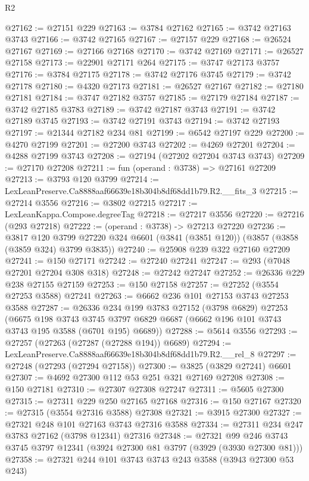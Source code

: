 \begin{lexlean}{R2}
\begin{coremodule}
@27162 := @27151 @229
@27163 := @3784 @27162
@27165 := @3742 @27163 @3743
@27166 := @3742 @27165
@27167 := @27157 @229
@27168 := @26524 @27167
@27169 := @27166 @27168
@27170 := @3742 @27169
@27171 := @26527 @27158
@27173 := @22901 @27171 @264
@27175 := @3747 @27173 @3757
@27176 := @3784 @27175
@27178 := @3742 @27176 @3745
@27179 := @3742 @27178
@27180 := @4320 @27173
@27181 := @26527 @27167
@27182 := @27180 @27181
@27184 := @3747 @27182 @3757
@27185 := @27179 @27184
@27187 := @3742 @27185 @3783
@27189 := @3742 @27187 @3743
@27191 := @3742 @27189 @3745
@27193 := @3742 @27191 @3743
@27194 := @3742 @27193
@27197 := @21344 @27182 @234 @81
@27199 := @6542 @27197 @229
@27200 := @4270 @27199
@27201 := @27200 @3743
@27202 := @4269 @27201
@27204 := @4288 @27199 @3743
@27208 := @27194 (@27202 @27204 @3743 @3743)
@27209 := @27170 @27208
@27211 := fun (operand : @3738) => @27161 @27209
@27213 := @3793 @120 @3799
@27214 := LexLeanPreserve.Ca8888aaf66639e18b304b8df68dd1b79.R2.__fits_3
@27215 := @27214 @3556
@27216 := @3802 @27215
@27217 := LexLeanKappa.Compose.degreeTag
@27218 := @27217 @3556
@27220 := @27216 (@293 @27218)
@27222 := (operand : @3738) -> @27213 @27220
@27236 := @3817
    @120
    @3799
    @27220
    @324
    @6601
    (@3841 (@3851 @120))
    (@3857 (@3858 (@3859 @324) @3799 @3835))
@27240 := @25908 @239 @322 @27160 @27209
@27241 := @150 @27171
@27242 := @27240 @27241
@27247 := @293 (@7048 @27201 @27204 @308 @318)
@27248 := @27242 @27247
@27252 := @26336 @229 @238 @27155 @27159
@27253 := @150 @27158
@27257 := @27252 (@3554 @27253 @3588) @27241
@27263 := @6662 @236 @101 @27153 @3743 @27253 @3588
@27287 := @26336
    @234
    @199
    @3783
    @27152
    (@3798 @6829)
    @27253
    (@6675
      @198
      @3743
      @3745
      @3797
      @6829
      @6687
      (@6662 @196 @101 @3743 @3743 @195 @3588 (@6701 @195) @6689))
@27288 := @5614 @3556
@27293 := @27257 (@27263 (@27287 (@27288 @194)) @6689)
@27294 := LexLeanPreserve.Ca8888aaf66639e18b304b8df68dd1b79.R2.__rel_8
@27297 := @27248 (@27293 (@27294 @27158))
@27300 := @3825 (@3829 @27241) @6601
@27307 := @4692 @27300 @112 @53 @251 @321 @27169 @27208
@27308 := @150 @27181
@27310 := @27307 @27308 @27247
@27311 := @5605 @27300
@27315 := @27311 @229 @250 @27165 @27168
@27316 := @150 @27167
@27320 := @27315 (@3554 @27316 @3588) @27308
@27321 := @3915 @27300
@27327 := @27321 @248 @101 @27163 @3743 @27316 @3588
@27334 := @27311 @234 @247 @3783 @27162 (@3798 @12341) @27316
@27348 := @27321
    @99
    @246
    @3743
    @3745
    @3797
    @12341
    (@3924 @27300 @81 @3797 (@3929 (@3930 @27300 @81)))
@27358 := @27321 @244 @101 @3743 @3743 @243 @3588 (@3943 @27300 @53 @243)

\end{coremodule}
\end{lexlean}
